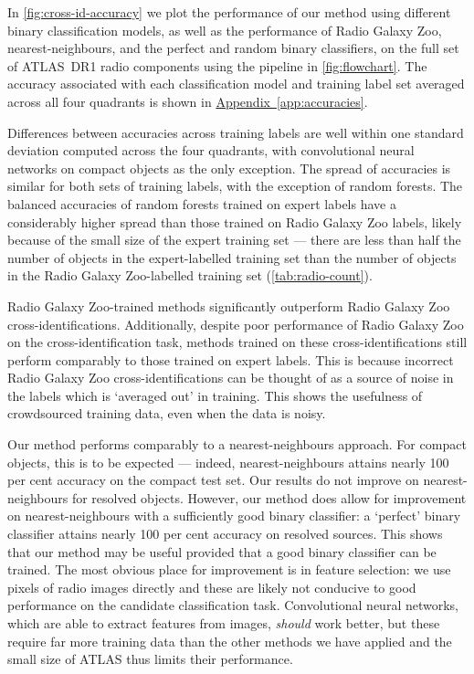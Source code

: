 \documentclass[fleqn,usenatbib,usedcolumn]{mnras}
\newcommand{\edited}[1]{#1}
\newcommand{\aref}[1]{\hyperref[#1]{Appendix~\ref{#1}}}
\begin{document}
    In \autoref{fig:cross-id-accuracy} we plot the performance \edited{of our
    method using different binary classification models}, as well as the
    performance of Radio Galaxy Zoo, nearest-neighbours, and the perfect and
    random binary classifiers, on the full set of ATLAS~DR1 radio components
    using the pipeline in \autoref{fig:flowchart}. The accuracy
    \edited{associated with each classification model} and training label set
    averaged across all four quadrants is shown in \aref{app:accuracies}.

    Differences between accuracies across training labels are well within one
    standard deviation computed across the four quadrants, with convolutional
    neural networks on compact objects as the only exception. The spread of
    accuracies is similar for both sets of training labels, with the exception
    of random forests. The balanced accuracies of random forests trained on
    expert labels have a considerably higher spread than those trained on
    Radio Galaxy Zoo labels, likely because of the small size of the expert
    training set --- there are less than half the number of objects in the
    expert-labelled training set than the number of objects in the Radio
    Galaxy Zoo-labelled training set (\autoref{tab:radio-count}).

    Radio Galaxy Zoo-trained methods significantly outperform Radio Galaxy Zoo
    cross-identifications. Additionally, despite poor performance of Radio
    Galaxy Zoo on the cross-identification task, methods trained on these
    cross-identifications still perform comparably to those trained on expert
    labels. This is because incorrect Radio Galaxy Zoo cross-identifications
    can be thought of as a source of noise in the labels which is `averaged out'
    in training. This shows the usefulness of crowdsourced training data, even
    when the data is noisy.

    Our method performs comparably to a nearest-neighbours approach. For
    compact objects, this is to be expected --- indeed, nearest-neighbours
    attains nearly 100 per cent accuracy on the compact test set. Our results
    do not improve on nearest-neighbours for resolved objects. However, our
    method does allow for improvement on nearest-neighbours with a
    sufficiently good binary classifier: a `perfect' binary classifier attains
    nearly 100 per cent accuracy on resolved sources. This shows that our
    method may be useful provided that a good binary classifier can be
    trained. The most obvious place for improvement is in feature selection:
    we use pixels of radio images directly and these are likely not conducive
    to good performance on the candidate classification task. Convolutional
    neural networks, which are able to extract features from images,
    \emph{should} work better, but these require far more training data than
    the other methods we have applied and the small size of ATLAS thus limits their performance.
\end{document}
